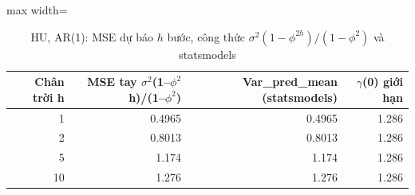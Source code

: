 \begin{table}[H]
\centering\small
\caption{HU, AR(1): MSE dự báo $h$ bước, công thức $\sigma^2(1-\phi^{2h})/(1-\phi^2)$ và statsmodels}\label{tab:tab_b11_06_ar1_forecast_mse}
\begin{adjustbox}{max width=\linewidth}
\begin{tabular}{rrrr}
\toprule
Chân trời h & MSE tay $\sigma^{2}$(1–$\phi^{2}$h)/(1–$\phi^{2}$) & Var\_pred\_mean (statsmodels) & $\gamma$(0) giới hạn \\
\midrule
1 & 0.4965 & 0.4965 & 1.286 \\
2 & 0.8013 & 0.8013 & 1.286 \\
5 & 1.174 & 1.174 & 1.286 \\
10 & 1.276 & 1.276 & 1.286 \\
\bottomrule
\end{tabular}
\end{adjustbox}
\end{table}
